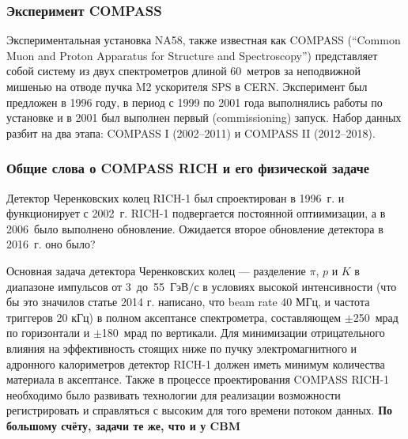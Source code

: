 \subsubsection{Эксперимент COMPASS}

Экспериментальная установка NA58, также известная как COMPASS (``Common Muon and Proton Apparatus for Structure and Spectroscopy'') представляет собой систему из двух спектрометров длиной 60~метров за неподвижной мишенью на отводе пучка M2 ускорителя SPS в CERN. Эксперимент был предложен в 1996 году, в период с 1999 по 2001 года выполнялись работы по установке и в 2001 был выполнен первый (commissioning) запуск. Набор данных разбит на два этапа: COMPASS I (2002--2011) и COMPASS II (2012--2018). 






\subsubsection{Общие слова о COMPASS RICH и его физической задаче}

Детектор Черенковских колец \mbox{RICH-1} был спроектирован в 1996~г. и функционирует с 2002~г. \mbox{RICH-1} подвергается постоянной оптиимизации, а в 2006~было выполнено обновление. Ожидается второе обновление детектора в 2016~г. \todo оно было?

Основная задача детектора Черенковских колец --- разделение $\pi$, $p$ и $K$ в диапазоне импульсов от 3~до~55~ГэВ/с в условиях высокой интенсивности (что бы это значило\todo в статье 2014 г. написано, что beam rate 40 МГц, и частота триггеров 20 кГц) в полном аксептансе спектрометра, составляющем $\pm$250~мрад по горизонтали и $\pm$180~мрад по вертикали. Для минимизации отрицательного влияния на эффективность стоящих ниже по пучку электромагнитного и адронного калориметров детектор \mbox{RICH-1} должен иметь минимум количества материала в аксептансе. Также в процессе проектирования COMPASS \mbox{RICH-1} необходимо было развивать технологии для реализации возможности регистрировать и справляться с высоким для того времени потоком данных.
\todo \textbf{По большому счёту, задачи те же, что и у CBM}

